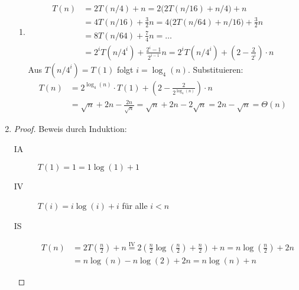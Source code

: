 \documentclass[11pt,a4paper]{article}
\begin{document}
\begin{loesung}
\begin{enumerate}
\begin{enumerate}[label=\roman*)]
        \item
        \begin{align*}
            T(n) &= 2T(n / 4) + n = 2\big(2T(n / 16) + n / 4\big) + n \\
            &= 4T(n / 16) + \frac{3}{2} n = 4\big(2T(n / 64) + n / 16\big) + \frac{3}{2}n \\
            &= 8T(n / 64) + \frac{7}{4} n = \ldots \\
            &= 2^i T(n / 4^i) + \frac{2^i - 1}{2^{i - 1}} n 
            = 2^i T(n / 4^i) + \left(2 - \frac{2}{2^i}\right) \cdot n
        \end{align*}
        Aus $T(n / 4^i) = T(1)$ folgt $i = \log_4(n)$. Substituieren:
        \begin{align*}
            T(n) &= 2^{\log_4(n)} \cdot T(1) + \left(2 - \frac{2}{2^{\log_4(n)}}\right) \cdot n  \\
            &= \sqrt{n} + 2n - \frac{2n}{\sqrt{n}} = \sqrt{n} + 2n - 2\sqrt{n}
            = 2n - \sqrt{n} = \Theta(n)
        \end{align*}
    \end{enumerate}

    \item
    \begin{proof}
        Beweis durch Induktion:
        \begin{description}
            \item[IA] $T(1) = 1 = 1 \log(1) + 1$
            \item[IV] $T(i) = i \log(i) + i$ für alle $i < n$
            \item[IS] 
            \begin{align*}
                T(n) &= 2T\left(\frac{n}{2}\right) + n
                \overset{\text{IV}}{=} 2 \left( \frac{n}{2} \log\left(\frac{n}{2}\right) + \frac{n}{2} \right) + n
                = n\log\left(\frac{n}{2} \right) + 2n \\
                &= n \log(n) - n \log(2) + 2n
                = n\log(n) + n
            \end{align*}
        \end{description}
    \end{proof}


\end{enumerate}
\end{loesung}
\end{document}
